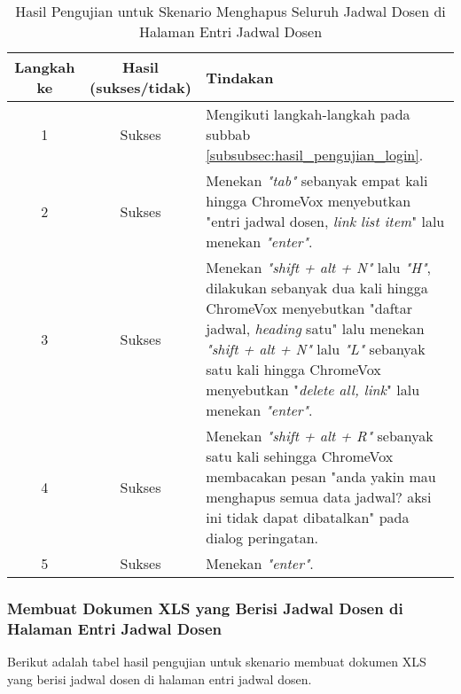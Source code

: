 \begin{table}[H]
    \centering 
    \caption{Hasil Pengujian untuk Skenario Menghapus Seluruh Jadwal Dosen di Halaman Entri Jadwal Dosen}
    \label{tab:hasil_pengujian_menghapus_seluruh_jadwal_dosen_di_halaman_entri_jadwal_dosen}
    \begin{tabular}{|c|c|p{10cm}|}
        \toprule
        Langkah ke & Hasil (sukses/tidak) & Tindakan \\

        \midrule
        1 & Sukses & Mengikuti langkah-langkah pada subbab \ref{subsubsec:hasil_pengujian_login}. \\
        2 & Sukses & Menekan \textit{"tab"} sebanyak empat kali hingga ChromeVox menyebutkan "entri jadwal dosen, \textit{link list item}" lalu menekan \textit{"enter"}. \\
        3 & Sukses & Menekan \textit{"shift + alt + N"} lalu \textit{"H"}, dilakukan sebanyak dua kali hingga ChromeVox menyebutkan "daftar jadwal, \textit{heading} satu" lalu menekan \textit{"shift + alt + N"} lalu \textit{"L"} sebanyak satu kali hingga ChromeVox menyebutkan "\textit{delete all, link}" lalu menekan \textit{"enter"}. \\
        4 & Sukses & Menekan \textit{"shift + alt + R"} sebanyak satu kali sehingga ChromeVox membacakan pesan "anda yakin mau menghapus semua data jadwal? aksi ini tidak dapat dibatalkan" pada dialog peringatan. \\
        5 & Sukses & Menekan \textit{"enter"}. \\

        \bottomrule

    \end{tabular}
\end{table}

\subsubsection{Membuat Dokumen XLS yang Berisi Jadwal Dosen di Halaman Entri Jadwal Dosen}
\label{subsubsec:hasil_pengujian_membuat_dokumen_xls_yang_berisi_jadwal_dosen_di_halaman_entri_jadwal_dosen}
Berikut adalah tabel hasil pengujian untuk skenario membuat dokumen XLS yang berisi jadwal dosen di halaman entri jadwal dosen.

